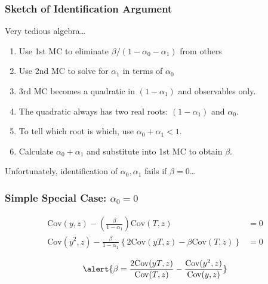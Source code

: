 \documentclass{beamer}
\begin{document}
\begin{frame}
  \frametitle{Sketch of Identification Argument}
  \alert{Very tedious algebra\ldots}
  \begin{enumerate}
    \item Use 1st MC to eliminate $\beta/(1 - \alpha_0 - \alpha_1)$ from others
    \item Use 2nd MC to solve for $\alpha_1$ in terms of $\alpha_0$ 
    \item 3rd MC becomes a quadratic in $(1-\alpha_1)$ and observables only.
    \item The quadratic always has two real roots: $(1 - \alpha_1)$ and $\alpha_0$.
    \item To tell which root is which, use $\alpha_0 + \alpha_1 < 1$.
    \item Calculate $\alpha_0 + \alpha_1$ and substitute into 1st MC to obtain $\beta$.
  \end{enumerate}

  \vspace{1em}
  \alert{Unfortunately, identification of $\alpha_0, \alpha_1$ fails if $\beta = 0$\ldots}
\end{frame}
\begin{frame}
  \frametitle{Simple Special Case: $\alpha_0 = 0$}
  \begin{align*}
    \mbox{Cov}(y,z) - \left( \frac{\beta}{1 - \alpha_1} \right) \mbox{Cov}(T,z) &= 0\\
  \mbox{Cov}(y^2,z) - \frac{\beta}{1 - \alpha_1}\left\{2\mbox{Cov}(yT,z)- \beta \mbox{Cov}(T,z)\right\} &= 0
  \end{align*}

  \vspace{1em}
  \[
    \alert{\beta = \frac{2\mbox{Cov}(yT,z)}{\mbox{Cov}(T,z)} - \frac{\mbox{Cov}(y^2,z)}{\mbox{Cov}(y,z)}}
  \]

\end{frame}
\end{document}
